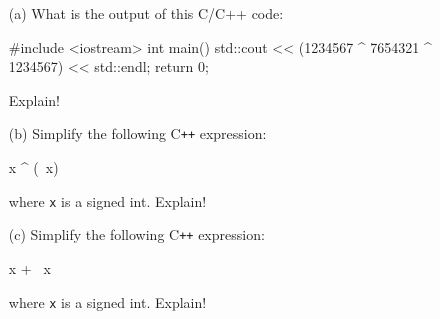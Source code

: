 \begin{enumerate}
\item[(a)]
  What is the output of this C/C++ code:
\begin{console}
#include <iostream>
int main()
{
    std::cout << (1234567 ^ 7654321 ^ 1234567) << std::endl;
    return 0;
}
\end{console}
Explain!

\item[(b)]
  Simplify the following C\texttt{++} expression:
  \begin{console}
x ^ (~x)
  \end{console}
where \verb!x! is a signed int.
Explain!

\item[(c)]
  Simplify the following C\texttt{++} expression:
  \begin{console}
x + ~x
  \end{console}
  where \verb!x! is a signed int.
Explain!

\end{enumerate}
